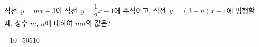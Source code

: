 직선~$y=mx+3$이 직선~$y=\dfrac{1}{2}x-1$에 수직이고, 직선~$y=(3-n)x-1$에 평행할 때, 상수 $m$, $n$에 대하여 $mn$의 값은?
\begin{choices32}{$-10$}{$-5$}{$0$}{$5$}{$10$}\end{choices32}
